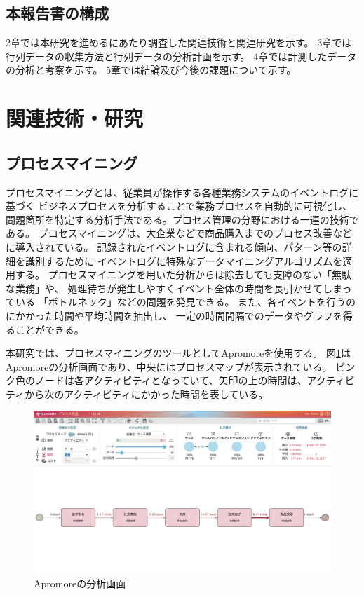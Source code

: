 \documentclass{jsarticle}
\begin{document}
\subsection{本報告書の構成}
2章では本研究を進めるにあたり調査した関連技術と関連研究を示す。
3章では行列データの収集方法と行列データの分析計画を示す。
4章では計測したデータの分析と考察を示す。
5章では結論及び今後の課題について示す。




\newpage


\section{関連技術・研究}
\subsection{プロセスマイニング}
プロセスマイニングとは、従業員が操作する各種業務システムのイベントログに基づく
ビジネスプロセスを分析することで業務プロセスを自動的に可視化し、
問題箇所を特定する分析手法である。プロセス管理の分野における一連の技術である。
プロセスマイニングは、大企業などで商品購入までのプロセス改善などに導入されている。
記録されたイベントログに含まれる傾向、パターン等の詳細を識別するために
イベントログに特殊なデータマイニングアルゴリズムを適用する。
プロセスマイニングを用いた分析からは除去しても支障のない「無駄な業務」や、
処理待ちが発生しやすくイベント全体の時間を長引かせてしまっている
「ボトルネック」などの問題を発見できる。
また、各イベントを行うのにかかった時間や平均時間を抽出し、
一定の時間間隔でのデータやグラフを得ることができる。

本研究では、プロセスマイニングのツールとしてApromoreを使用する。
図\ref{fig:3}はApromoreの分析画面であり、中央にはプロセスマップが表示されている。
ピンク色のノードは各アクティビティとなっていて、矢印の上の時間は、アクティビティから次のアクティビティにかかった時間を表している。

\begin{figure}[H]
  \centering
  \includegraphics[width=15cm]{3.png}
  \caption{Apromoreの分析画面}
  \label{fig:3}
\end{figure}
\end{document}
